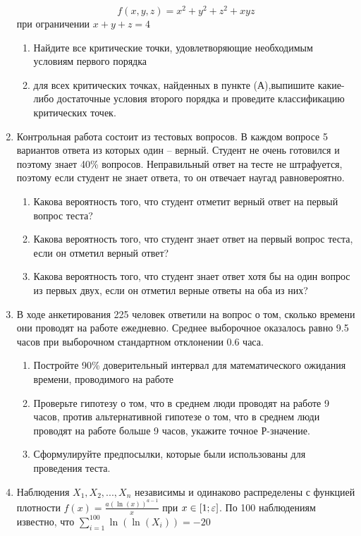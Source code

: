 \documentclass[pdftex,12pt,a4paper]{article}
\begin{document}
\begin{enumerate}
\begin{equation}
f(x,y,z)=x^2+y^2+z^2+xyz
\end{equation}
при ограничении $x+y+z=4$
\begin{enumerate}
\item Найдите все критические точки, удовлетворяющие необходимым условиям первого порядка
\item для всех критических точках, найденных в пункте (А),выпишите какие-либо достаточные условия второго порядка и проведите классификацию критических точек.
\end{enumerate}
\item Контрольная работа состоит из тестовых вопросов. В каждом вопросе 5 вариантов ответа из которых один – верный. Студент не очень готовился и поэтому знает 40\% вопросов. Неправильный ответ на тесте не штрафуется, поэтому если студент не знает ответа, то он отвечает наугад равновероятно.
\begin{enumerate}
\item Какова вероятность того, что студент отметит верный ответ на первый вопрос теста?
\item Какова вероятность того, что студент знает ответ на первый вопрос теста, если он отметил верный ответ?
\item Какова вероятность того, что студент знает ответ хотя бы на один вопрос из первых двух, если он отметил верные ответы на оба из них?
\end{enumerate}
\item В ходе анкетирования 225 человек ответили на вопрос о том, сколько времени они проводят на работе ежедневно. Среднее выборочное оказалось равно 9.5 часов при выборочном стандартном отклонении 0.6 часа.
\begin{enumerate}
\item Постройте 90\% доверительный интервал для математического ожидания времени, проводимого на работе
\item Проверьте гипотезу о том, что в среднем люди проводят на работе 9 часов, против альтернативной гипотезе о том, что в среднем люди проводят на работе больше 9 часов, укажите точное Р-значение.
\item Сформулируйте предпосылки, которые были использованы для проведения теста.
\end{enumerate}
\item Наблюдения $X_1,X_2,...,X_n$ независимы и одинаково распределены с функцией плотности $f(x)=\frac{a(\ln(x))^{a-1}}{x}$ при $x\in [1;\varepsilon]$. По 100 наблюдениям известно, что $\sum_{i=1}^100 \ln(\ln(X_i))=-20$

\end{enumerate}
\end{document}
